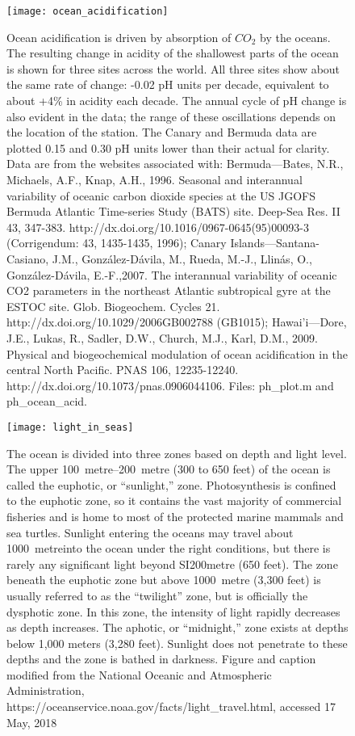 {\newpage
\begin{figure}[p]
\centering
  \texttt{[image: ocean\_acidification]}%
\caption{Ocean acidification is driven by absorption of $CO_2$ by the oceans. The resulting change in acidity of the shallowest parts of the ocean is shown for three sites across the world. All three sites show about the same rate of change: -0.02 pH units per decade, equivalent to about +4\% in acidity each decade. The annual cycle of pH change is also evident in the data; the range of these oscillations depends on the location of the station. The Canary and Bermuda data are plotted 0.15 and 0.30 pH units lower than their actual for clarity. Data are from the websites associated with: Bermuda---Bates, N.R., Michaels, A.F., Knap, A.H., 1996. Seasonal and interannual variability of oceanic carbon dioxide species at the US JGOFS Bermuda Atlantic Time-series Study (BATS) site. Deep-Sea Res. II 43, 347-383. http://dx.doi.org/10.1016/0967-0645(95)00093-3 (Corrigendum: 43, 1435-1435, 1996); Canary Islands---Santana-Casiano, J.M., Gonz\'alez-D\'avila, M., Rueda, M.-J., Llin\'as, O., Gonz\'alez-D\'avila, E.-F.,2007. The interannual variability of oceanic CO2 parameters in the northeast Atlantic subtropical gyre at the ESTOC site. Glob. Biogeochem. Cycles 21. http://dx.doi.org/10.1029/2006GB002788 (GB1015); Hawai'i---Dore, J.E., Lukas, R., Sadler, D.W., Church, M.J., Karl, D.M., 2009. Physical and biogeochemical modulation of ocean acidification in the central North Pacific. PNAS 106, 12235-12240. http://dx.doi.org/10.1073/pnas.0906044106. Files: ph\_plot.m and ph\_ocean\_acid.
}
\label{fig:oa}
\end{figure}

\newpage
\begin{figure}[p]
\centering
  \texttt{[image: light\_in\_seas]}%
\caption{The ocean is divided into three zones based on depth and light level. The upper \SIrange{100}{200}{metre} (300 to 650 feet) of the ocean is called the euphotic, or ``sunlight,'' zone. Photosynthesis is confined to the euphotic zone, so it contains the vast majority of commercial fisheries and is home to most of the protected marine mammals and sea turtles. Sunlight entering the oceans may travel about \SI{1000}{metre}into the ocean under the right conditions, but there is rarely any significant light beyond SI{200}{metre} (650 feet). The zone beneath the euphotic zone but above \SI{1000}{metre} (3,300 feet) is usually referred to as the ``twilight'' zone, but is officially the dysphotic zone. In this zone, the intensity of light rapidly decreases as depth increases. The aphotic, or ``midnight,'' zone exists at depths below 1,000 meters (3,280 feet). Sunlight does not penetrate to these depths and the zone is bathed in darkness. Figure and caption modified from the National Oceanic and Atmospheric Administration, https://oceanservice.noaa.gov/facts/light\_travel.html, accessed 17 May, 2018}
\label{fig:light_in_seas}
\end{figure}

}
